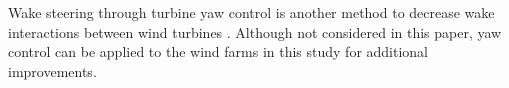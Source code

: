 

Wake steering through turbine yaw control is another method to decrease wake interactions between wind turbines  \citep{Fleming2016,gebraad2017maximization}. Although not considered in this paper, yaw control can be applied to the wind farms in this study for additional improvements.




